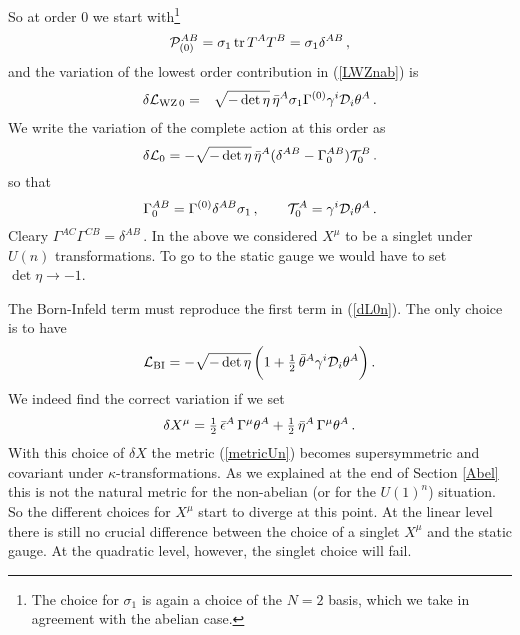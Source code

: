\documentclass[12pt,a4paper]{article}
\def\half{{\textstyle {1 \over 2}}}
\def\Dpartial{{\cal D}}
\def\tr{\,{\rm tr}\,}
\begin{document}
So at order 0 we start with\footnote{The choice for $\sigma_1$ is again
a choice of the $N=2$ basis, which we take in agreement with the
 abelian case.}
\begin{equation}
   {\cal P}_{(0)}^{AB} = \sigma_1 \tr T^AT^B = \sigma_1 \delta^{AB}\,,
\end{equation}
and the variation of the lowest order contribution in (\ref{LWZnab})
is
\begin{eqnarray}
\label{dLWZnab0}
 \delta {\cal L}_{{\rm WZ}\,0} &=&
      \sqrt{-\det \eta} \,\bar\eta^A \sigma_1
     \Gamma^{(0)} \gamma^i\Dpartial_i\theta^A \,.
\end{eqnarray}
We write the variation of the complete action at this order as
\begin{equation}
\label{dL0n}
  \delta {\cal L}_0 =  -\sqrt{-\det \eta}\, \bar\eta^A
    (\delta^{AB}
     - \Gamma_0^{AB}){\cal T}_0^B\,.
\end{equation}
so that
\begin{equation}
  \Gamma_0^{AB} = \Gamma^{(0)}\delta^{AB}\sigma_1\,,\qquad
   {\cal T}^A_0 = \gamma^i\Dpartial_i\theta^A\,.
\end{equation}
Cleary $\Gamma^{AC}\Gamma^{CB} = \delta^{AB}$\,.
In the above we considered $X^\mu$ to be a singlet under $U(n)$
transformations. To go to the static gauge we would have to set
$\det\eta\to -1$.

The Born-Infeld term must reproduce the first term in (\ref{dL0n}).
The only choice is to have
\begin{equation}
  \label{LBInab0}
    {\cal L}_{{\rm BI}} = -\sqrt{-\det\eta}\,\bigg(
    1 + \half\,\bar\theta^A\gamma^i\Dpartial_i\theta^A \bigg)\,.
\end{equation}
We indeed find the correct variation if we set
\begin{equation}
   \label{dXnab}
   \delta X^\mu  = \half\,\bar\epsilon^A\,\Gamma^\mu\theta^A
       + \half\,\bar\eta^A\,\Gamma^\mu\theta^A \,.
\end{equation}
With this choice of $\delta X$ the metric (\ref{metricUn})
becomes supersymmetric and covariant under $\kappa$-transformations.
As we explained at the end of Section \ref{Abel} this is not
the natural metric for the non-abelian (or for the $U(1)^n$)
situation. So the different choices for $X^\mu$
start to diverge at this point. At the linear level there is still
no crucial difference between the choice of a singlet $X^\mu$
and the static gauge. At the quadratic level, however, the
singlet choice will fail.
\end{document}
